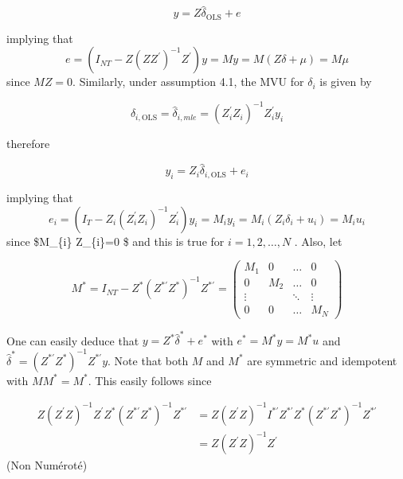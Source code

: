 \documentclass[
]{book}
\begin{document}
\begin{equation}
y=Z \widehat{\delta}_{\mathrm{OLS}}+e
\end{equation}

implying that \[e=\left(I_{NT}-Z \left(Z Z^{\prime}\right)^{-1}Z^{\prime}\right)y =My=M\left(Z\delta +\mu \right)= M \mu \] since \(MZ=0\). Similarly,
under assumption 4.1, the MVU for \(\delta_i\) is given by

\begin{equation}
\widehat{\delta}_{i, \mathrm{OLS}}=\widehat{\delta}_{i, m l e}=\left(Z_{i}^{\prime} Z_{i}\right)^{-1} Z_{i}^{\prime} y_{i}
\end{equation}

therefore

\begin{equation}
y_{i}=Z_{i} \widehat{\delta}_{i, \mathrm{OLS}}+e_{i}
\end{equation}

implying that \[ e_{i}=\left(I_{T}-Z_{i}\left(Z_{i}^{\prime} Z_{i}\right)^{-1} Z_{i}^{\prime}\right) y_{i}=M_{i} y_{i}=M_{i}\left(Z_{i} \delta_{i}+u_{i}\right)=M_{i} u_{i}\] since \$M\_\{i\} Z\_\{i\}=0 \$ and this is true for \(i=1,2, \ldots, N\) . Also, let

\[
M^{*}=I_{N T}-Z^{*}\left(Z^{* \prime} Z^{*}\right)^{-1} Z^{* \prime}=\left(\begin{array}{cccc}
M_{1} & 0 & \ldots & 0 \\
0 & M_{2} & \ldots & 0 \\
\vdots & & \ddots & \vdots \\
0 & 0 & \ldots & M_{N}
\end{array}\right)
\]

One can easily deduce that \(y=Z^{*} \widehat{\delta}^{*}+e^{*}\) with \(e^{*}=M^{*} y=M^{*} u\) and \(\widehat{\delta}^{*}=\left(Z^{* \prime} Z^{*}\right)^{-1} Z^{* \prime} y\).
Note that both \(M\) and \(M^{*}\) are symmetric and idempotent with \(M M^{*}=M^{*}\). This easily follows since

\begin{equation}
\begin{aligned}
Z\left(Z^{\prime} Z\right)^{-1} Z^{\prime} Z^{*}\left(Z^{* \prime} Z^{*}\right)^{-1} Z^{* \prime} &=Z\left(Z^{\prime} Z\right)^{-1} I^{* \prime} Z^{* \prime} Z^{*}\left(Z^{* \prime} Z^{*}\right)^{-1} Z^{* \prime} \\
&=Z\left(Z^{\prime} Z\right)^{-1} Z^{\prime}
\end{aligned}
\end{equation} (Non Numéroté)
\end{document}
